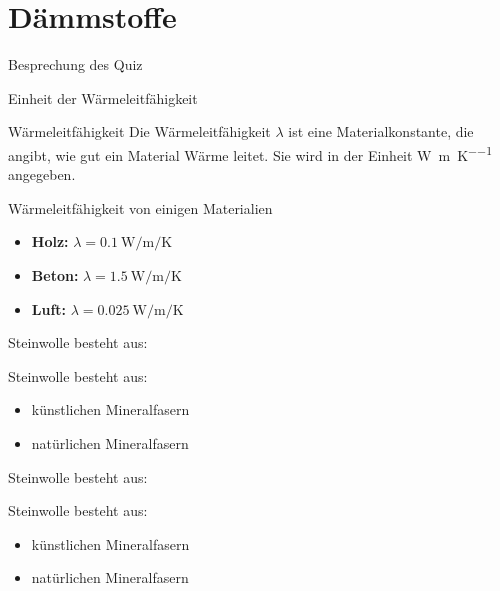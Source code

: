 \section{Dämmstoffe}
\BlueSectionSlide


\begin{frame}{Besprechung des Quiz}

\end{frame}


\begin{frame}{Einheit der Wärmeleitfähigkeit}
	\begin{Definition_BS}{Wärmeleitfähigkeit}
		Die Wärmeleitfähigkeit $\lambda$ ist eine Materialkonstante, die angibt, wie gut ein Material Wärme leitet. Sie wird in der Einheit \si{\watt\per\meter\per\kelvin} angegeben.
	\end{Definition_BS}
	\pause
	\begin{Beispiel}{Wärmeleitfähigkeit von einigen Materialien}
		\begin{itemize}
			\item[\textbullet] \textbf{Holz:} $\lambda = \SI{0.1}{\watt\per\meter\per\kelvin}$
			\item[\textbullet] \textbf{Beton:} $\lambda = \SI{1.5}{\watt\per\meter\per\kelvin}$
			\item[\textbullet] \textbf{Luft:} $\lambda = \SI{0.025}{\watt\per\meter\per\kelvin}$
		\end{itemize}
	\end{Beispiel}
\end{frame}

\begin{frame}{Steinwolle besteht aus:}
    \begin{Fragenblock}
        Steinwolle besteht aus:
        
        \begin{itemize}
            \item[\faSquare] künstlichen Mineralfasern
            \item[\faSquare] natürlichen Mineralfasern
        \end{itemize}
    \end{Fragenblock}
\end{frame}

\begin{frame}{Steinwolle besteht aus:}
    \begin{Fragenblock}
        Steinwolle besteht aus:
        
        \begin{itemize}
			\item[\textcolor{green!70!black}{\faCheckSquare}] künstlichen Mineralfasern
			\item[\faSquare] natürlichen Mineralfasern
        \end{itemize}
    \end{Fragenblock}
\end{frame}


